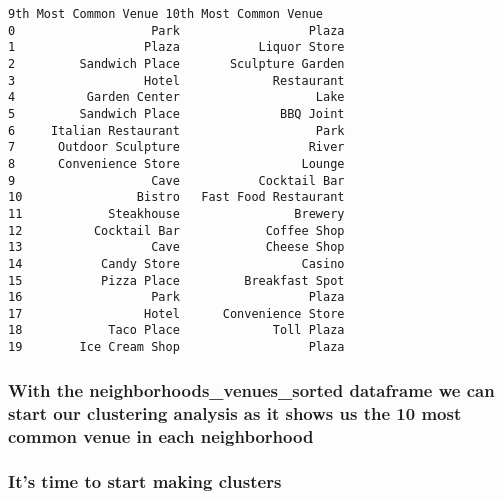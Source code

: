 \documentclass[11pt]{article}
\begin{document}
\begin{tcolorbox}[breakable, size=fbox, boxrule=.5pt, pad at break*=1mm, opacityfill=0]
\begin{Verbatim}[commandchars=\\\{\}]
   9th Most Common Venue 10th Most Common Venue
0                   Park                  Plaza
1                  Plaza           Liquor Store
2         Sandwich Place       Sculpture Garden
3                  Hotel             Restaurant
4          Garden Center                   Lake
5         Sandwich Place              BBQ Joint
6     Italian Restaurant                   Park
7      Outdoor Sculpture                  River
8      Convenience Store                 Lounge
9                   Cave           Cocktail Bar
10                Bistro   Fast Food Restaurant
11            Steakhouse                Brewery
12          Cocktail Bar            Coffee Shop
13                  Cave            Cheese Shop
14           Candy Store                 Casino
15           Pizza Place         Breakfast Spot
16                  Park                  Plaza
17                 Hotel      Convenience Store
18            Taco Place             Toll Plaza
19        Ice Cream Shop                  Plaza
\end{Verbatim}
\end{tcolorbox}
        
    \hypertarget{with-the-neighborhoods_venues_sorted-dataframe-we-can-start-our-clustering-analysis-as-it-shows-us-the-10-most-common-venue-in-each-neighborhood}{%
\subsubsection{With the neighborhoods\_venues\_sorted dataframe we can
start our clustering analysis as it shows us the 10 most common venue in
each
neighborhood}\label{with-the-neighborhoods_venues_sorted-dataframe-we-can-start-our-clustering-analysis-as-it-shows-us-the-10-most-common-venue-in-each-neighborhood}}

\hypertarget{its-time-to-start-making-clusters}{%
\subsubsection{It's time to start making
clusters}\label{its-time-to-start-making-clusters}}
\end{document}

